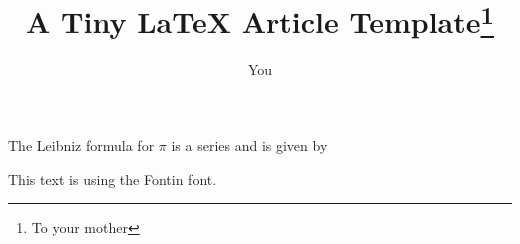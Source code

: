 \documentclass{article}
\title{A Tiny \LaTeX{} Article Template\thanks{To your mother}}
\author{You}
\begin{document}
\maketitle

The Leibniz formula for $\pi$ is a series and is given by



\vspace{2cm}
\fontin This text is using the Fontin font.
\end{document}
